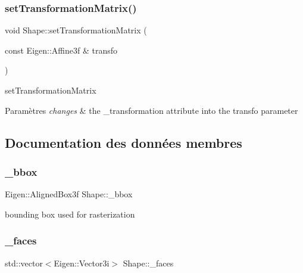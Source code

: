 \subsubsection{\texorpdfstring{set\+Transformation\+Matrix()}{setTransformationMatrix()}}
{\footnotesize\ttfamily void Shape\+::set\+Transformation\+Matrix (\begin{DoxyParamCaption}\item[{const Eigen\+::\+Affine3f \&}]{transfo }\end{DoxyParamCaption})\hspace{0.3cm}{\ttfamily [inline]}}



set\+Transformation\+Matrix 


\begin{DoxyParams}{Paramètres}
{\em changes} & the \+\_\+transformation attribute into the transfo parameter \\
\hline
\end{DoxyParams}


\subsection{Documentation des données membres}
\mbox{\label{class_shape_aa2399d2b2884c25ebc2e8f87584cc529}} 
\subsubsection{\texorpdfstring{\+\_\+bbox}{\_bbox}}
{\footnotesize\ttfamily Eigen\+::\+Aligned\+Box3f Shape\+::\+\_\+bbox\hspace{0.3cm}{\ttfamily [protected]}}



bounding box used for rasterization 

\mbox{\label{class_shape_abb07b26e344946f745964c019a2c598e}} 
\subsubsection{\texorpdfstring{\+\_\+faces}{\_faces}}
{\footnotesize\ttfamily std\+::vector$<$Eigen\+::\+Vector3i$>$ Shape\+::\+\_\+faces\hspace{0.3cm}{\ttfamily [protected]}}


